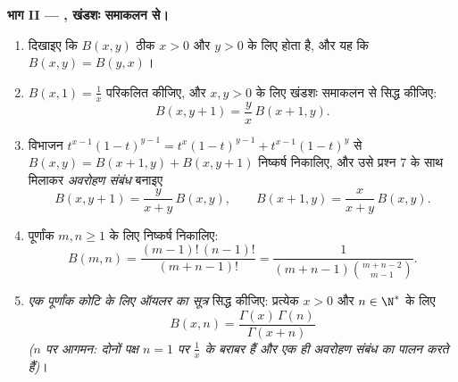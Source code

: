 \begin{problem}
\medskip
\noindent\textbf{भाग II --- , खंडशः समाकलन से।}
\begin{enumerate}[resume]
  \item दिखाइए कि $B(x,y)$ ठीक $x > 0$ और $y >
        0$ के लिए  होता है, और यह कि
        $B(x,y) = B(y,x)$।
  \item $B(x, 1) = \frac1x$ परिकलित कीजिए, और $x, y > 0$ के लिए खंडशः समाकलन से सिद्ध कीजिए:
        \[
        B(x, y+1) = \frac{y}{x}\,B(x+1, y) .
        \]
  \item विभाजन $t^{x-1}(1-t)^{y-1} =
        t^{x}(1-t)^{y-1} + t^{x-1}(1-t)^{y}$ से $B(x,y) =
        B(x+1,y) + B(x,y+1)$ निष्कर्ष निकालिए, और उसे प्रश्न 7 के साथ
        मिलाकर \emph{अवरोहण संबंध} बनाइए
        \[
        B(x, y+1) = \frac{y}{x+y}\,B(x,y),
        \qquad
        B(x+1, y) = \frac{x}{x+y}\,B(x,y) .
        \]
  \item पूर्णांक $m, n \geq 1$ के लिए निष्कर्ष निकालिए:
        \[
        B(m, n) = \frac{(m-1)!\,(n-1)!}{(m+n-1)!}
        = \frac{1}{(m+n-1)\binom{m+n-2}{m-1}} .
        \]
  \item \emph{एक पूर्णांक कोटि के लिए ऑयलर का सूत्र} सिद्ध कीजिए:
        प्रत्येक $x > 0$ और $n \in \N^*$ के लिए
        \[
        B(x, n) = \frac{\Gamma(x)\,\Gamma(n)}{\Gamma(x + n)}
        \]
        \emph{($n$ पर आगमन: दोनों पक्ष $n
        = 1$ पर $\frac1x$ के बराबर हैं और
        एक ही अवरोहण संबंध का पालन करते हैं)}।
\end{enumerate}


\end{problem}
